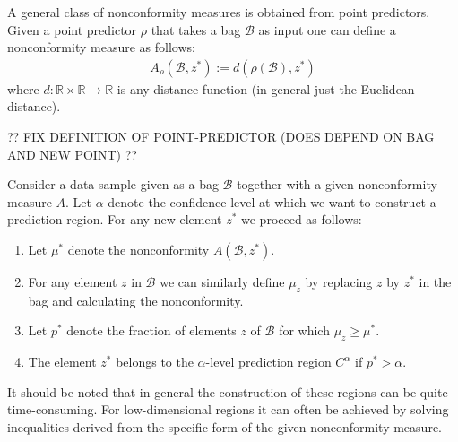     \begin{example}
        A general class of nonconformity measures is obtained from point predictors. Given a point predictor $\rho$ that takes a bag $\mathcal{B}$ as input one can define a nonconformity measure as follows:
        \begin{gather}
            A_\rho(\mathcal{B}, z^*) := d(\rho(\mathcal{B}), z^*)
        \end{gather}
        where $d:\mathbb{R}\times\mathbb{R}\rightarrow\mathbb{R}$ is any distance function (in general just the Euclidean distance).
    \end{example}

    ?? FIX DEFINITION OF POINT-PREDICTOR (DOES DEPEND ON BAG AND NEW POINT) ??

    \begin{construct}\label{data:cp}
        Consider a data sample given as a bag $\mathcal{B}$ together with a given nonconformity measure $A$. Let $\alpha$ denote the confidence level at which we want to construct a prediction region. For any new element $z^*$ we proceed as follows:
        \begin{enumerate}
            \item Let $\mu^*$ denote the nonconformity $A(\mathcal{B}, z^*)$.
            \item For any element $z$ in $\mathcal{B}$ we can similarly define $\mu_z$ by replacing $z$ by $z^*$ in the bag and calculating the nonconformity.
            \item Let $p^*$ denote the fraction of elements $z$ of $\mathcal{B}$ for which $\mu_z\geq\mu^*$.
            \item The element $z^*$ belongs to the $\alpha$-level prediction region $C^\alpha$ if $p^*>\alpha$.
        \end{enumerate}
        It should be noted that in general the construction of these regions can be quite time-consuming. For low-dimensional regions it can often be achieved by solving inequalities derived from the specific form of the given nonconformity measure.
    \end{construct}


